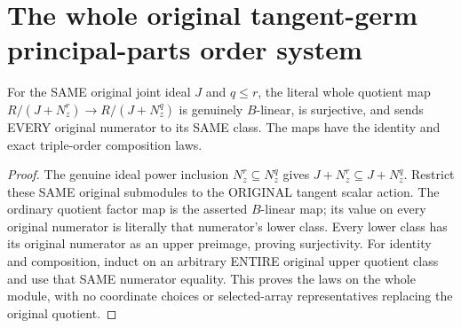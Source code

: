 \section{The whole original tangent-germ principal-parts order system}

\begin{theorem}
\label{hir:actual-centre-principal-parts-whole-order-system}
For the SAME original joint ideal $J$ and $q\le r$, the literal whole
quotient map $R/(J+N_z^r)\to R/(J+N_z^q)$ is genuinely $B$-linear,
is surjective, and sends EVERY original numerator to its SAME class.
The maps have the identity and exact triple-order composition laws.
\leanok
\end{theorem}
\begin{proof}
The genuine ideal power inclusion $N_z^r\subseteq N_z^q$ gives
$J+N_z^r\subseteq J+N_z^q$. Restrict these SAME original submodules to
the ORIGINAL tangent scalar action. The ordinary quotient factor map
is the asserted $B$-linear map; its value on every original numerator
is literally that numerator's lower class. Every lower class has its
original numerator as an upper preimage, proving surjectivity. For
identity and composition, induct on an arbitrary ENTIRE original upper
quotient class and use that SAME numerator equality. This proves the
laws on the whole module, with no coordinate choices or selected-array
representatives replacing the original quotient.
\end{proof}

